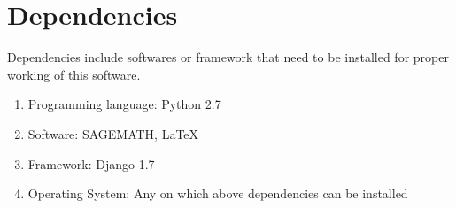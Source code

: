 \section{Dependencies}
Dependencies include softwares or framework that need to be installed for 
proper working of this software.

\begin{enumerate} 
\item Programming language: Python 2.7
\item Software: SAGEMATH, \LaTeX{}
\item Framework: Django 1.7
\item Operating System: Any on which above dependencies can be installed
\end{enumerate}

